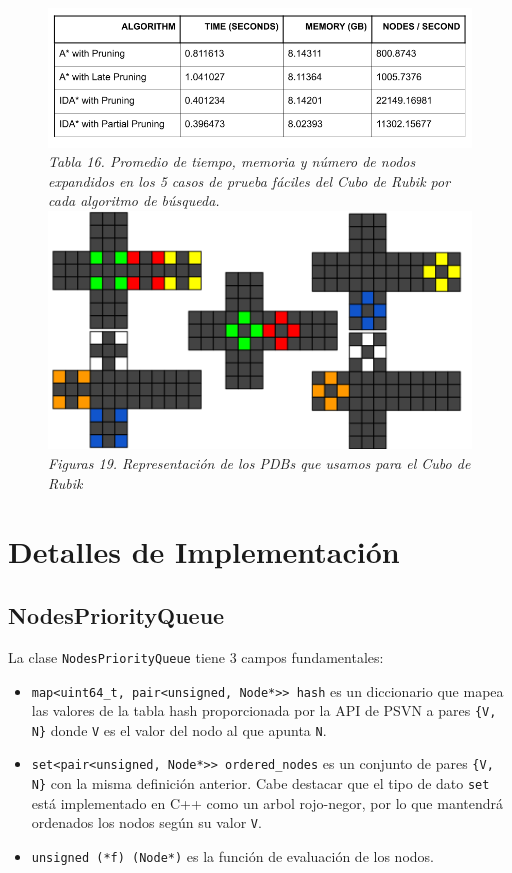 \documentclass[a4paper,10pt]{article}
\begin{document}
    \begin{figure}[t!]
      \centering
      \includegraphics[scale=0.3]{rubik/tabla1.png} \\
      \textit{\small{Tabla 16. Promedio de tiempo, 
      memoria y n\'umero de nodos expandidos en los 5 casos de prueba
      f\'aciles del Cubo de Rubik por cada algoritmo de b\'usqueda.}}\\
      \includegraphics[scale=0.2]{rubik/pdb.png} \\
      \small{\textit{Figuras 19. Representaci\'on de los
      PDBs que usamos para el Cubo de Rubik}}
    \end{figure}

\section{Detalles de Implementaci\'on}
  \subsection{NodesPriorityQueue}
    La clase \verb|NodesPriorityQueue| tiene 3 campos fundamentales:
    \begin{itemize}
      \item \verb|map<uint64_t, pair<unsigned, Node*>> hash| es un diccionario
      que mapea las valores de la tabla hash proporcionada por la API de PSVN
      a pares \verb|{V, N}| donde \verb|V| es el valor del nodo al que apunta
      \verb|N|.

      \item \verb|set<pair<unsigned, Node*>> ordered_nodes| es un conjunto de 
      pares \verb|{V, N}| con la misma definici\'on anterior. Cabe destacar 
      que el tipo de dato \verb|set| est\'a implementado en C++ como un arbol 
      rojo-negor, por lo que mantendr\'a ordenados los nodos seg\'un su valor 
      \verb|V|.

      \item \verb|unsigned (*f) (Node*)| es la funci\'on de evaluaci\'on de 
      los nodos.
    \end{itemize}
\end{document}
